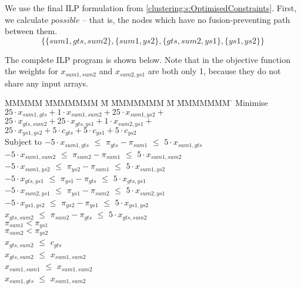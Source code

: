 We use the final ILP formulation from \autoref{clustering:s:OptimisedConstraints}. First, we calculate $possible$ -- that is, the nodes which have no fusion-preventing path between them.
\[ \{ \{sum1, gts, sum2\}
 , \{sum1, ys2\}
 , \{gts, sum2, ys1\}
 , \{ys1, ys2\} \} \]

The complete ILP program is shown below. Note that in the objective function the weights for $x_{sum1, sum2}$ and $x_{sum2, ys1}$ are both only 1, because they do not share any input arrays.

\begin{tabbing}
MMMMM   \= MMMMMMM \= M \= MMMMMMM \= M \= MMMMMMM \= \kill
Minimise   \> $25 \cdot x_{sum1, gts} + 1  \cdot x_{sum1,sum2} + 25 \cdot x_{sum1, ys2} +$ \\
           \> $25 \cdot x_{gts, sum2} + 25 \cdot x_{gts, ys1} + 1 \cdot x_{sum2, ys1} +$ \\
           \> $25 \cdot x_{ys1, ys2}  + 5  \cdot c_{gts} + 5 \cdot c_{ys1} + 5 \cdot c_{ys2} $
\\[0.5ex]
Subject to 
    \> $-5 \cdot x_{sum1, gts}$  \> $\le$ \> $\pi_{gts} - \pi_{sum1}$  \> $\le$ \> $5 \cdot x_{sum1, gts}$  \\
    \> $-5 \cdot x_{sum1, sum2}$ \> $\le$ \> $\pi_{sum2} - \pi_{sum1}$ \> $\le$ \> $5 \cdot x_{sum1, sum2}$ \\
    \> $-5 \cdot x_{sum1, ys2 }$ \> $\le$ \> $\pi_{ys2 } - \pi_{sum1}$ \> $\le$ \> $5 \cdot x_{sum1, ys2 }$ \\
    \> $-5 \cdot x_{gts,  ys1 }$ \> $\le$ \> $\pi_{ys1 } - \pi_{gts }$ \> $\le$ \> $5 \cdot x_{gts, ys1  }$ \\
    \> $-5 \cdot x_{sum2, ys1 }$ \> $\le$ \> $\pi_{ys1 } - \pi_{sum2}$ \> $\le$ \> $5 \cdot x_{sum2, ys1 }$ \\
    \> $-5 \cdot x_{ys1, ys2  }$ \> $\le$ \> $\pi_{ys2 } - \pi_{ys1 }$ \> $\le$ \> $5 \cdot x_{ys1, ys2  }$ 
\\[0.5ex]
    \> $   x_{gts, sum2 }$ \> $\le$ \> $\pi_{sum2} - \pi_{gts }$ \> $\le$ \> $5 \cdot x_{gts, sum2 }$ 
\\[0.5ex]
    \>                     \>       \> $\pi_{sum1} < \pi_{ys1}$ \\
    \>                     \>       \> $\pi_{sum2} < \pi_{ys2}$
\\[0.5ex]
    \> $ x_{gts,sum2} $    \> $\le$ \> $c_{gts}$
\\[0.5ex]
    \> $x_{gts, sum2}$     \> $\le$ \> $x_{sum1, sum2}$ \\
    \> $x_{sum1,sum1}$     \> $\le$ \> $x_{sum1, sum2}$ \\
    \> $x_{sum1, gts}$     \> $\le$ \> $x_{sum1, sum2}$
\end{tabbing}
\noindent

